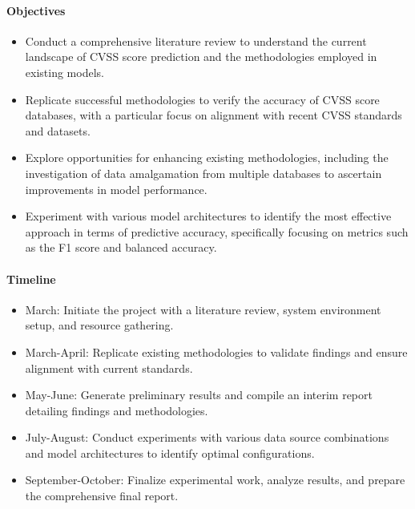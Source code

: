 \documentclass[11pt]{article}
\begin{document}
\paragraph{Objectives}
\begin{itemize}[noitemsep]
	\item Conduct a comprehensive literature review to understand the current landscape of CVSS score prediction and the methodologies employed in existing models.
	\item Replicate successful methodologies to verify the accuracy of CVSS score databases, with a particular focus on alignment with recent CVSS standards and datasets.
	\item Explore opportunities for enhancing existing methodologies, including the investigation of data amalgamation from multiple databases to ascertain improvements in model performance.
	\item Experiment with various model architectures to identify the most effective approach in terms of predictive accuracy, specifically focusing on metrics such as the F1 score and balanced accuracy.
\end{itemize}

\paragraph{Timeline}
\begin{itemize}[noitemsep]
	\item March: Initiate the project with a literature review, system environment setup, and resource gathering.
	\item March-April: Replicate existing methodologies to validate findings and ensure alignment with current standards.
	\item May-June: Generate preliminary results and compile an interim report detailing findings and methodologies.
	\item July-August: Conduct experiments with various data source combinations and model architectures to identify optimal configurations.
	\item September-October: Finalize experimental work, analyze results, and prepare the comprehensive final report.
\end{itemize}

\noindent
\end{document}
